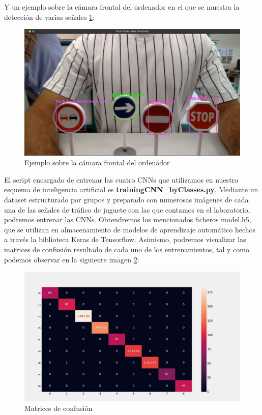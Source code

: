 Y un ejemplo sobre la cámara frontal del ordenador en el que se muestra la detección de varias señales \ref{yolocamara}:

\begin{figure}[H]
	\centering
	\includegraphics[width=\textwidth]{Imagenes/AnexoI_Manual/AA/YoloCNN_camara.pdf}
	\caption{Ejemplo sobre la cámara frontal del ordenador}
	\label{yolocamara}
\end{figure}

El script encargado de entrenar las cuatro CNNs que utilizamos en nuestro esquema de inteligencia artificial es \textbf{trainingCNN_byClasses.py}. Mediante un dataset estructurado por grupos y preparado con numerosas imágenes de cada una de las señales de tráfico de juguete con las que contamos en el laboratorio, podremos entrenar las CNNs. Obtendremos los mencionados ficheros model.h5, que se utilizan en almacenamiento de modelos de aprendizaje automático hechos a través la biblioteca Keras de Tensorflow. Asimismo, podremos visualizar las matrices de confusión resultado de cada uno de los entrenamientos, tal y como podemos observar en la siguiente imagen \ref{matriz}:

\begin{figure}[H]
	\centering
	\includegraphics[width=\textwidth]{Imagenes/AnexoI_Manual/AA/ejemplo_matrizConfusion.pdf}
	\caption{Matrices de confusión}
	\label{matriz}
\end{figure}

